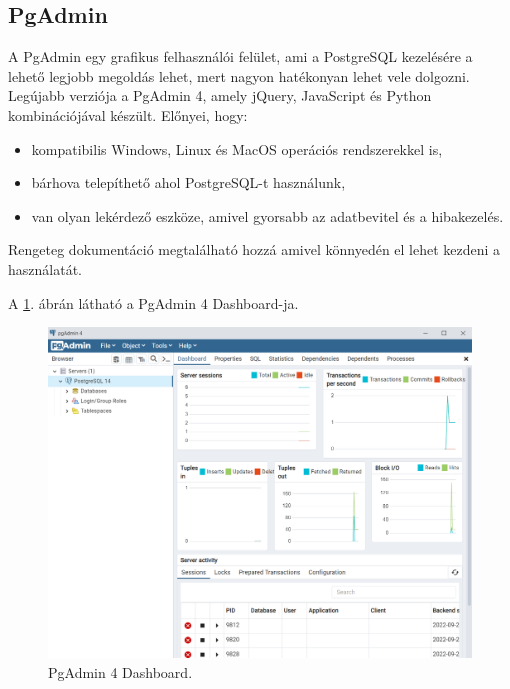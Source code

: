 \subsection{PgAdmin}

A PgAdmin \cite{PgAdmin} egy grafikus felhasználói felület, ami a PostgreSQL kezelésére a lehető legjobb megoldás lehet, mert nagyon hatékonyan lehet vele dolgozni. Legújabb verziója a PgAdmin 4, amely jQuery, JavaScript és Python kombinációjával készült. Előnyei, hogy:

\begin{itemize}
\item kompatibilis Windows, Linux és MacOS operációs rendszerekkel is,
\item bárhova telepíthető ahol PostgreSQL-t használunk,
\item van olyan lekérdező eszköze, amivel gyorsabb az adatbevitel és a hibakezelés.
\end{itemize}

Rengeteg dokumentáció megtalálható hozzá amivel könnyedén el lehet kezdeni a használatát.

A \ref{fig:PgAdmin 4}. ábrán látható a PgAdmin 4 Dashboard-ja.

\begin{figure}[h]
\centering
\includegraphics[scale=0.3]{images/PgAdmin.png}
\caption{PgAdmin 4 Dashboard.}
\label{fig:PgAdmin 4}
\end{figure}
\newpage


